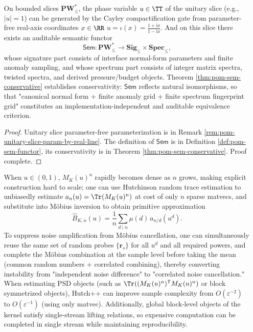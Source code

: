 \begin{conclusion}\label{con:xi-terminal-sem-conservative-unitary-slice}
On bounded slices \(\mathbf{PW}^{\ast}_{\le}\), the phase variable \(u\in\TT\) of the unitary slice (e.g., \(|u|=1\)) can be generated by the Cayley compactification gate from parameter-free real-axis coordinates \(x\in\RR\)
\(
u=\iota(x)=\frac{1+\mathrm{i}x}{1-\mathrm{i}x}
\).
And on this slice there exists an auditable semantic functor
\[
\mathsf{Sem}:\mathbf{PW}^{\ast}_{\le}\longrightarrow \mathbf{Sig}_{\le}\times \mathbf{Spec}_{\le},
\]
whose signature part consists of interface normal-form parameters and finite anomaly sampling, and whose spectrum part consists of integer matrix spectra, twisted spectra, and derived pressure/budget objects.
Theorem \ref{thm:pom-sem-conservative} establishes conservativity: \(\mathsf{Sem}\) reflects natural isomorphisms, so that "canonical normal form + finite anomaly grid + finite spectrum fingerprint grid" constitutes an implementation-independent and auditable equivalence criterion.
\end{conclusion}
\begin{proof}[Proof]
Unitary slice parameter-free parameterization is in Remark \ref{rem:pom-unitary-slice-param-by-real-line}.
The definition of \(\mathsf{Sem}\) is in Definition \ref{def:pom-sem-functor}, its conservativity is in Theorem \ref{thm:pom-sem-conservative}. Proof complete.
\end{proof}
\begin{conclusion}\label{con:xi-terminal-intermediate-u-mobius-hutchinson}
When \(u\in(0,1)\), \(M_K(u)^n\) rapidly becomes dense as \(n\) grows, making explicit construction hard to scale;
one can use Hutchinson random trace estimation to unbiasedly estimate
\(
a_n(u)=\Tr(M_K(u)^n)
\)
at cost of only \(n\) sparse matvecs, and substitute into Möbius inversion to obtain primitive approximation
\[
\widehat B_{K,n}(u)=\frac1n\sum_{d\mid n}\mu(d)\,\widehat a_{n/d}(u^d).
\]
To suppress noise amplification from Möbius cancellation, one can simultaneously reuse the same set of random probes \(\{\mathbf r_s\}\) for all \(u^d\) and all required powers, and complete the Möbius combination at the sample level before taking the mean (common random numbers + correlated combining), thereby converting instability from "independent noise difference" to "correlated noise cancellation."
When estimating PSD objects (such as \(\Tr((M_K(u)^n)^{\mathsf T}M_K(u)^n)\) or block symmetrized objects), Hutch++ can improve sample complexity from \(O(\varepsilon^{-2})\) to \(O(\varepsilon^{-1})\) (using only matvec).
Additionally, global block-level objects of the kernel satisfy single-stream lifting relations, so expensive computation can be completed in single stream while maintaining reproducibility.
\end{conclusion}
